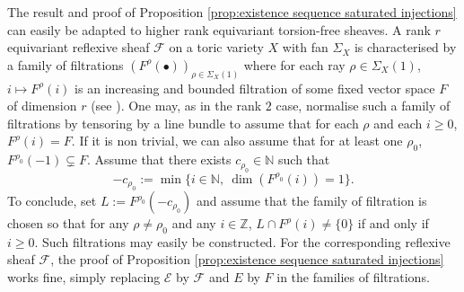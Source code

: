 \documentclass[a4paper,10pt]{amsart}
\theoremstyle{plain}{
    \newtheorem{theorem}{Theorem}[section]
    \newtheorem{lemma}[theorem]{Lemma}
    \newtheorem{corollary}[theorem]{Corollary}
    \newtheorem{proposition}[theorem]{Proposition}
    \newtheorem{conjecture}[theorem]{Conjecture}
}
\theoremstyle{definition}{
    \newtheorem{definition}[theorem]{Definition}
    \newtheorem{defn-thm}[theorem]{Definition-Theorem}
    \newtheorem{example}[theorem]{Example}
    \newtheorem{notation}[theorem]{Notation}
}
\theoremstyle{remark}{
    \newtheorem{remark}[theorem]{Remark}
    \newtheorem{problem}[theorem]{Problem}
    \newtheorem{question}[theorem]{Question}
}
\def\um{{\bf m}}
\def\cF{\mathcal{F}}
\def\cE{\mathcal{E}}
\def\Z{\mathbb{Z}}
\def\N{\mathbb{N}}
\begin{document}

\begin{remark}
 \label{rem:higher rank existence saturated}
 The result and proof of Proposition \ref{prop:existence sequence saturated injections} can easily be adapted to higher rank equivariant torsion-free sheaves. A rank $r$ equivariant reflexive sheaf $\cF$ on a toric variety $X$ with fan $\Sigma_X$ is characterised by a family of filtrations $(F^\rho(\bullet))_{\rho\in\Sigma_X(1)}$ where for each ray $\rho\in\Sigma_X(1)$, $i\mapsto F^\rho(i)$ is an increasing and bounded filtration of some fixed vector space $F$ of dimension $r$ (see \cite{Per04}). One may, as in the rank $2$ case, normalise such a family of filtrations by tensoring by a line bundle to assume that for each $\rho$ and each $i\geq 0$, $F^\rho(i)=F$. If it is non trivial, we can also assume that for at least one $\rho_0$, $F^{\rho_0}(-1)\subsetneq F$. Assume that there exists $c_{\rho_0}\in\N $ such that
 $$
 -c_{\rho_0}:=\min\lbrace i\in\N,\: \dim(F^{\rho_0}(i))=1  \rbrace.
 $$
 To conclude, set $L:=F^{\rho_0}(-c_{\rho_0})$ and assume that the family of filtration is chosen so that for any $\rho\neq \rho_0$ and any $i\in\Z$,  $L\cap F^\rho(i)\neq \lbrace 0\rbrace$ if and only if $i\geq 0$. Such filtrations may easily be constructed. For the corresponding reflexive sheaf $\cF$, the proof of Proposition \ref{prop:existence sequence saturated injections} works fine, simply replacing $\cE$ by $\cF$ and $E$ by $F$ in the families of filtrations.
\end{remark}
\end{document}
